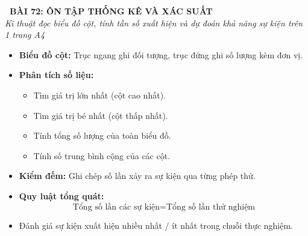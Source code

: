 \documentclass[14pt,a4paper,oneside]{extbook}
\begin{document}
\noindent
\begin{tcolorbox}[
  enhanced,
  colback=teal!8!white,
  colframe=teal!80!black,
  arc=3mm, boxrule=1pt,
  left=3mm, right=3mm, top=2mm, bottom=2mm,
  halign=center
]
  {\Large\bfseries\color{teal!90!black}\faBookmark\ BÀI 72: ÔN TẬP THỐNG KÊ VÀ XÁC SUẤT}\\[1.5pt]
  {\footnotesize\itshape\color{black!75} Kĩ thuật đọc biểu đồ cột, tính tần số xuất hiện và dự đoán khả năng sự kiện trên 1 trang A4}
\end{tcolorbox}

\vspace{-2.5mm}

\noindent
\begin{minipage}[t]{0.49\textwidth}\vspace{0pt}
\begin{tcolorbox}[
  enhanced,
  colback=blue!4!white,
  colframe=blue!75!black,
  arc=2mm, boxrule=0.8pt,
  left=2mm, right=2mm, top=1.8mm, bottom=1.8mm,
  title={\footnotesize\bfseries\color{white}\faBarChart\ 1. Biểu đồ cột \& Thống kê}
]
{\footnotesize
\begin{itemize}\setlength{\itemsep}{1pt}\setlength{\leftskip}{-2.5mm}
  \item \textbf{Biểu đồ cột:} Trục ngang ghi đối tượng, trục đứng ghi số lượng kèm đơn vị.
  \item \textbf{Phân tích số liệu:}
  \begin{itemize}\setlength{\itemsep}{0.5pt}\setlength{\leftskip}{-2.5mm}
    \item Tìm giá trị lớn nhất (cột cao nhất).
    \item Tìm giá trị bé nhất (cột thấp nhất).
    \item Tính tổng số lượng của toàn biểu đồ.
    \item Tính số trung bình cộng của các cột.
  \end{itemize}
\end{itemize}
}
\end{tcolorbox}
\end{minipage}
\hfill
\begin{minipage}[t]{0.49\textwidth}\vspace{0pt}
\begin{tcolorbox}[
  enhanced,
  colback=teal!4!white,
  colframe=teal!75!black,
  arc=2mm, boxrule=0.8pt,
  left=2mm, right=2mm, top=1.8mm, bottom=1.8mm,
  title={\footnotesize\bfseries\color{white}\faQuestionCircle\ 2. Xác suất thực nghiệm}
]
{\footnotesize
\begin{itemize}\setlength{\itemsep}{1.5pt}\setlength{\leftskip}{-2.5mm}
  \item \textbf{Kiểm đếm:} Ghi chép số lần xảy ra sự kiện qua từng phép thử.
  \item \textbf{Quy luật tổng quát:}
  $$\text{Tổng số lần các sự kiện} = \text{Tổng số lần thử nghiệm}$$
  \item Đánh giá sự kiện xuất hiện nhiều nhất / ít nhất trong chuỗi thực nghiệm.
\end{itemize}
}
\end{tcolorbox}
\end{minipage}
\end{document}

